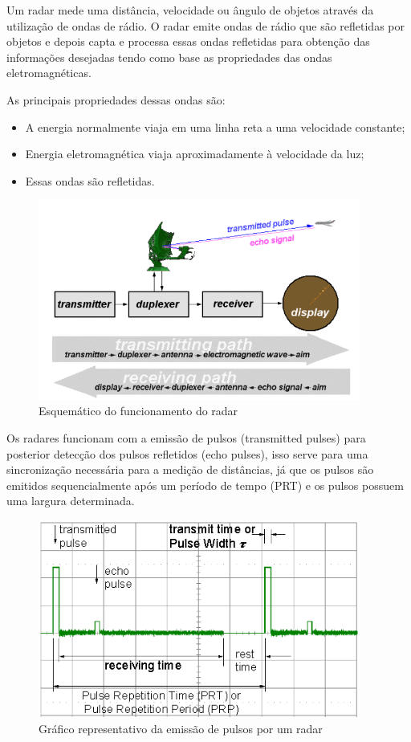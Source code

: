 Um radar mede uma distância, velocidade ou ângulo de objetos através da
utilização de ondas de rádio. O radar emite ondas de rádio que são refletidas
por objetos e depois capta e processa essas ondas refletidas para obtenção das
informações desejadas tendo como base as propriedades das ondas eletromagnéticas.

As principais propriedades dessas ondas são:

\begin{itemize}
  \item A energia normalmente viaja em uma linha reta a uma velocidade constante;
  \item Energia eletromagnética viaja aproximadamente à velocidade da luz;
  \item Essas ondas são refletidas.
\end{itemize}

\begin{figure}[h]
  \centering
  \includegraphics[width=400px, scale=1]{figuras/funcionamento_radar}
  \caption{Esquemático do funcionamento do radar}
\label{fig:funcionamento_radar}
\end{figure}

Os radares funcionam com a emissão de pulsos (transmitted pulses) para posterior detecção dos pulsos refletidos
(echo pulses), isso serve para uma sincronização necessária para a medição de distâncias, já que os pulsos
são emitidos sequencialmente após um período de tempo (PRT) e os pulsos possuem
uma largura determinada.

\begin{figure}[h]
  \centering
  \includegraphics[width=400px, scale=1]{figuras/emissao_pulsos_radar}
  \caption{Gráfico representativo da emissão de pulsos por um radar}
\label{fig:emissao_pulsos_radar}
\end{figure}

